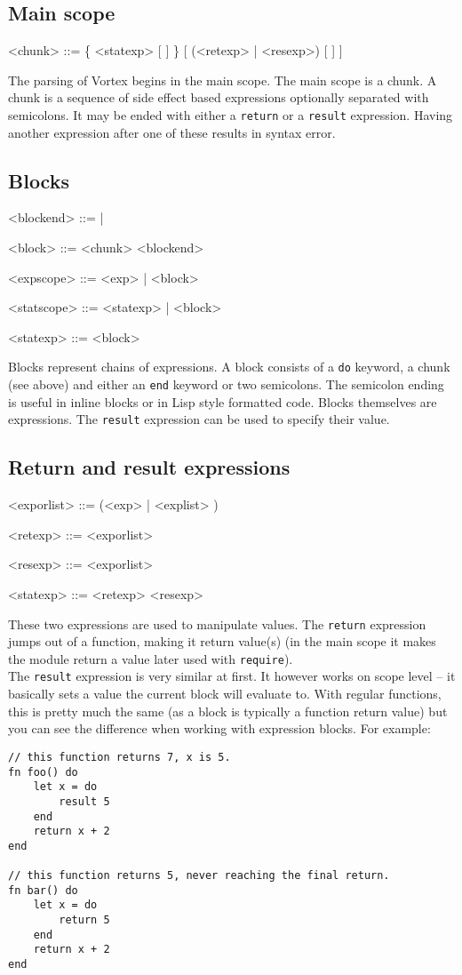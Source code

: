 \documentclass{article}
\newenvironment{bnf}
{
\begin{mdframed}
\begin{grammar}
}
{
\end{grammar}
\end{mdframed}
}
\begin{document}
\subsection{Main scope}
\begin{bnf}
<chunk> ::= \{ <statexp> [ \lit{;} ] \} [ (<retexp> | <resexp>) [ \lit{;} ] ]
\end{bnf}
The parsing of Vortex begins in the main scope. The main scope is a chunk.
A chunk is a sequence of side effect based expressions optionally separated
with semicolons. It may be ended with either a \verb|return| or a \verb|result|
expression. Having another expression after one of these results in syntax
error.
\subsection{Blocks}
\begin{bnf}
<blockend> ::=  | \lit{;;}

<block> ::=  <chunk> <blockend>

<expscope> ::= \lit{->} <exp> | <block>

<statscope> ::= \lit{->} <statexp> | <block>

<statexp> ::= <block>
\end{bnf}
Blocks represent chains of expressions. A block consists of a \verb|do|
keyword, a chunk (see above) and either an \verb|end| keyword or two
semicolons. The semicolon ending is useful in inline blocks or in
Lisp style formatted code. Blocks themselves are expressions. The \verb|result|
expression can be used to specify their value.
\subsection{Return and result expressions}
\begin{bnf}
<exporlist> ::= (<exp> | \lit{(} <explist> \lit{)})

<retexp> ::=  <exporlist>

<resexp> ::=  <exporlist>

<statexp> ::= <retexp> <resexp>
\end{bnf}
These two expressions are used to manipulate values. The \verb|return|
expression jumps out of a function, making it return value(s) (in the main
scope it makes the module return a value later used with \verb|require|).\\
The \verb|result| expression is very similar at first. It however works on
scope level -- it basically sets a value the current block will evaluate to.
With regular functions, this is pretty much the same (as a block is typically
a function return value) but you can see the difference when working with
expression blocks. For example:
\begin{lstlisting}[language=vortex]
// this function returns 7, x is 5.
fn foo() do
    let x = do
        result 5
    end
    return x + 2
end

// this function returns 5, never reaching the final return.
fn bar() do
    let x = do
        return 5
    end
    return x + 2
end
\end{lstlisting}
\end{document}

